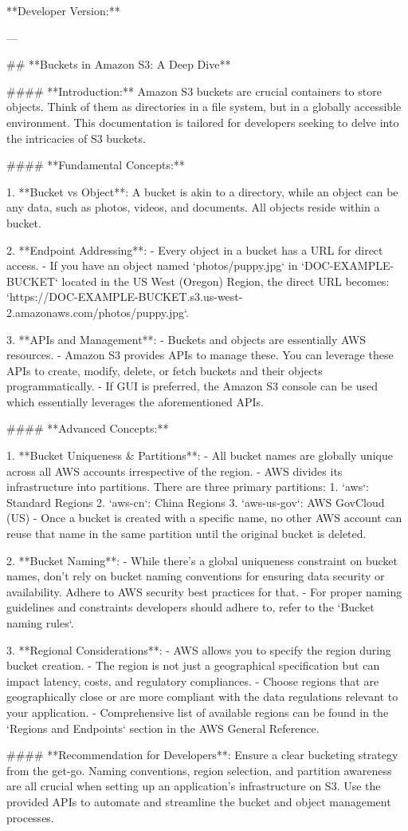 **Developer Version:**

---

## **Buckets in Amazon S3: A Deep Dive**

#### **Introduction:**
Amazon S3 buckets are crucial containers to store objects. Think of them as directories in a file system, but in a globally accessible environment. This documentation is tailored for developers seeking to delve into the intricacies of S3 buckets.

#### **Fundamental Concepts:**

1. **Bucket vs Object**: A bucket is akin to a directory, while an object can be any data, such as photos, videos, and documents. All objects reside within a bucket.

2. **Endpoint Addressing**:
    - Every object in a bucket has a URL for direct access. 
    - If you have an object named `photos/puppy.jpg` in `DOC-EXAMPLE-BUCKET` located in the US West (Oregon) Region, the direct URL becomes: 
    `https://DOC-EXAMPLE-BUCKET.s3.us-west-2.amazonaws.com/photos/puppy.jpg`.

3. **APIs and Management**:
    - Buckets and objects are essentially AWS resources.
    - Amazon S3 provides APIs to manage these. You can leverage these APIs to create, modify, delete, or fetch buckets and their objects programmatically.
    - If GUI is preferred, the Amazon S3 console can be used which essentially leverages the aforementioned APIs.

#### **Advanced Concepts:**

1. **Bucket Uniqueness & Partitions**:
    - All bucket names are globally unique across all AWS accounts irrespective of the region.
    - AWS divides its infrastructure into partitions. There are three primary partitions:
        1. `aws`: Standard Regions
        2. `aws-cn`: China Regions
        3. `aws-us-gov`: AWS GovCloud (US)
    - Once a bucket is created with a specific name, no other AWS account can reuse that name in the same partition until the original bucket is deleted.

2. **Bucket Naming**:
    - While there's a global uniqueness constraint on bucket names, don't rely on bucket naming conventions for ensuring data security or availability. Adhere to AWS security best practices for that.
    - For proper naming guidelines and constraints developers should adhere to, refer to the `Bucket naming rules`.

3. **Regional Considerations**:
    - AWS allows you to specify the region during bucket creation.
    - The region is not just a geographical specification but can impact latency, costs, and regulatory compliances. 
    - Choose regions that are geographically close or are more compliant with the data regulations relevant to your application.
    - Comprehensive list of available regions can be found in the `Regions and Endpoints` section in the AWS General Reference.

#### **Recommendation for Developers**:
Ensure a clear bucketing strategy from the get-go. Naming conventions, region selection, and partition awareness are all crucial when setting up an application's infrastructure on S3. Use the provided APIs to automate and streamline the bucket and object management processes.